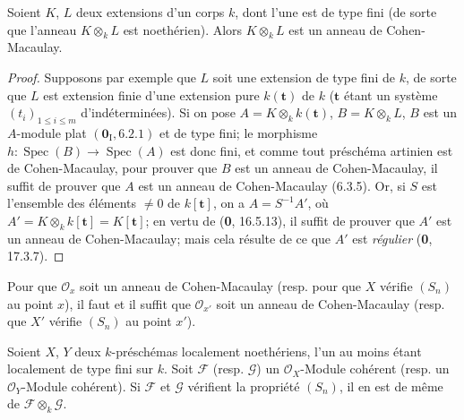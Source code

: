 \begin{lemma}[6.7.1.1]
\label{IV.2.s6.7.1.1-fr}
Soient $K$, $L$ deux extensions d'un corps $k$, dont l'une est de type
fini (de sorte que l'anneau $K\otimes_k L$ est noethérien). Alors
$K\otimes_k L$ est un anneau de Cohen-Macaulay.
\end{lemma}

\begin{proof}
Supposons par exemple que $L$ soit une extension de type fini de $k$,
de sorte que $L$ est extension finie d'une extension pure $k(\mathbf t)$
de $k$ ($\mathbf t$ étant un système $(t_i)_{1\leqslant i\leqslant m}$
d'indéterminées). Si on pose $A=K\otimes_k k(\mathbf t)$,
$B=K\otimes_k L$, $B$ est un $A$-module plat $(\mathbf{0}_{\mathrm I},6.2.1)$ et de type fini;
le morphisme $h:\operatorname{Spec}(B)\to\operatorname{Spec}(A)$ est
donc fini, et comme tout préschéma artinien est de Cohen-Macaulay, pour
prouver que $B$ est un anneau de Cohen-Macaulay, il suffit de prouver que
$A$ est un anneau de Cohen-Macaulay (6.3.5). Or, si $S$ est l'ensemble
des éléments $\neq 0$ de $k[\mathbf t]$, on a $A=S^{-1}A'$, où
$A'=K\otimes_k k[\mathbf t]=K[\mathbf t]$; en vertu de
(\textbf{0}, 16.5.13), il suffit de prouver que $A'$ est un anneau de
Cohen-Macaulay; mais cela résulte de ce que $A'$ est \emph{régulier} (\textbf{0}, 17.3.7).
\end{proof}

\begin{corollary}[6.7.2]
Pour que $\mathcal O_x$ soit un anneau de Cohen-Macaulay \textup{(resp.} pour
que $X$ vérifie $(S_n)$ au point $x$), il faut et il suffit
que $\mathcal O_{x'}$ soit un anneau de Cohen-Macaulay \textup{(resp.} que $X'$
vérifie $(S_n)$ au point $x'$).
\end{corollary}

\begin{corollary}[6.7.3]
\label{IV.2.s6.7.3-fr}
Soient $X$, $Y$ deux $k$-préschémas localement noethériens, l'un au
moins étant localement de type fini sur $k$. Soit $\mathscr F$ \textup{(resp.}
$\mathscr G$) un $\mathcal O_X$-Module cohérent \textup{(resp.} un
$\mathcal O_Y$-Module cohérent). Si $\mathscr F$ et $\mathscr G$
vérifient la propriété $(S_n)$, il en est de même de
$\mathscr F\otimes_k\mathscr G$.
\end{corollary}

